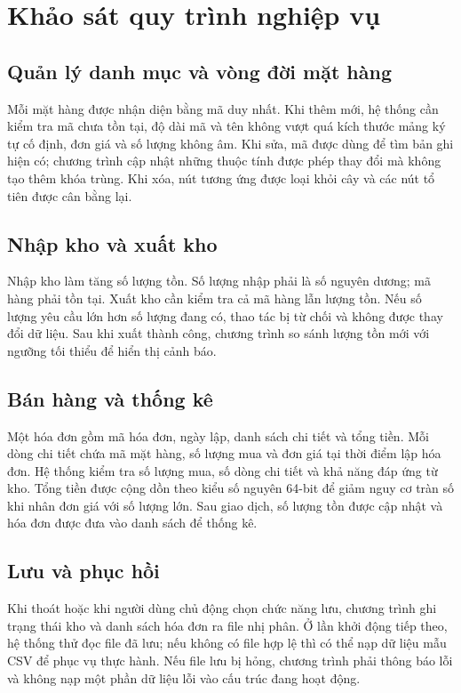 \section{Khảo sát quy trình nghiệp vụ}
\subsection{Quản lý danh mục và vòng đời mặt hàng}
Mỗi mặt hàng được nhận diện bằng mã duy nhất. Khi thêm mới, hệ thống cần kiểm tra mã chưa tồn tại, độ dài mã và tên không vượt quá kích thước mảng ký tự cố định, đơn giá và số lượng không âm. Khi sửa, mã được dùng để tìm bản ghi hiện có; chương trình cập nhật những thuộc tính được phép thay đổi mà không tạo thêm khóa trùng. Khi xóa, nút tương ứng được loại khỏi cây và các nút tổ tiên được cân bằng lại.

\subsection{Nhập kho và xuất kho}
Nhập kho làm tăng số lượng tồn. Số lượng nhập phải là số nguyên dương; mã hàng phải tồn tại. Xuất kho cần kiểm tra cả mã hàng lẫn lượng tồn. Nếu số lượng yêu cầu lớn hơn số lượng đang có, thao tác bị từ chối và không được thay đổi dữ liệu. Sau khi xuất thành công, chương trình so sánh lượng tồn mới với ngưỡng tối thiểu để hiển thị cảnh báo.

\subsection{Bán hàng và thống kê}
Một hóa đơn gồm mã hóa đơn, ngày lập, danh sách chi tiết và tổng tiền. Mỗi dòng chi tiết chứa mã mặt hàng, số lượng mua và đơn giá tại thời điểm lập hóa đơn. Hệ thống kiểm tra số lượng mua, số dòng chi tiết và khả năng đáp ứng từ kho. Tổng tiền được cộng dồn theo kiểu số nguyên 64-bit để giảm nguy cơ tràn số khi nhân đơn giá với số lượng lớn. Sau giao dịch, số lượng tồn được cập nhật và hóa đơn được đưa vào danh sách để thống kê.

\subsection{Lưu và phục hồi}
Khi thoát hoặc khi người dùng chủ động chọn chức năng lưu, chương trình ghi trạng thái kho và danh sách hóa đơn ra file nhị phân. Ở lần khởi động tiếp theo, hệ thống thử đọc file đã lưu; nếu không có file hợp lệ thì có thể nạp dữ liệu mẫu CSV để phục vụ thực hành. Nếu file lưu bị hỏng, chương trình phải thông báo lỗi và không nạp một phần dữ liệu lỗi vào cấu trúc đang hoạt động.

